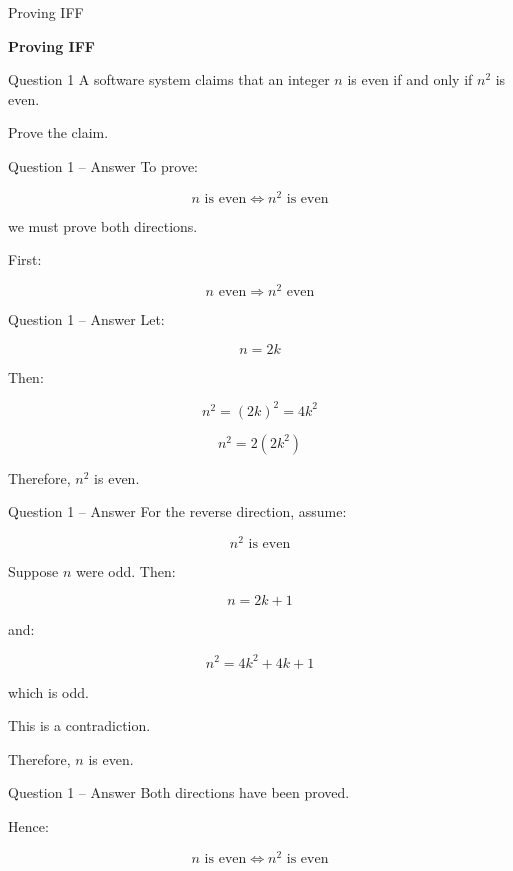 \begin{frame}{Proving IFF}
\begin{center}
\vspace{1.5cm}
{\Huge\textbf{Proving IFF}}
\end{center}
\end{frame}


\begin{frame}{Question 1}
A software system claims that an integer $n$ is even if and only if
$n^2$ is even.

Prove the claim.
\end{frame}

\begin{frame}{Question 1 -- Answer}
To prove:

$$
n\text{ is even}\iff n^2\text{ is even}
$$

we must prove both directions.

First:

$$
n\text{ even}\Rightarrow n^2\text{ even}
$$

\end{frame}

\begin{frame}{Question 1 -- Answer}
Let:

$$
n=2k
$$

Then:

$$
n^2=(2k)^2=4k^2
$$

$$
n^2=2(2k^2)
$$

Therefore, $n^2$ is even.
\end{frame}

\begin{frame}{Question 1 -- Answer}
For the reverse direction, assume:

$$
n^2\text{ is even}
$$

Suppose $n$ were odd. Then:

$$
n=2k+1
$$

and:

$$
n^2=4k^2+4k+1
$$

which is odd.

This is a contradiction.

Therefore, $n$ is even.
\end{frame}

\begin{frame}{Question 1 -- Answer}
Both directions have been proved.

Hence:

$$
\boxed{n\text{ is even}\iff n^2\text{ is even}}
$$

\end{frame}

